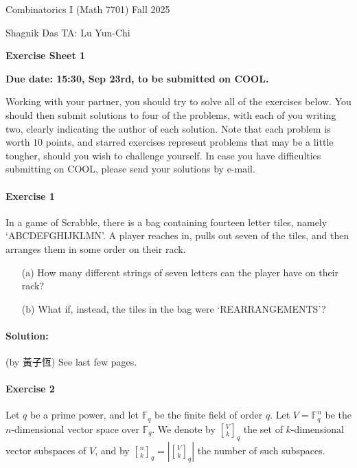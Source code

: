\documentclass[a4paper,12pt]{article}
\newcommand{\courseTitle}{Combinatorics I (Math 7701)}
\newcommand{\semester}{Fall 2025}
\newcommand{\instructorA}{Shagnik Das}
\newcommand{\instructorB}{TA: Lu Yun-Chi}
\newcommand{\sheetNumber}{1}
\newcommand{\dueDate}{15:30, Sep 23rd, to be submitted on COOL.}
\newcommand{\buildtitle}[4]{
\begin{flushleft}
{\large
#1
\hfill{}
#2
\par
#3
}
\end{flushleft}
\vskip 4pt
\begin{center}
{\large\bfseries#4\par}
\end{center}
\bigskip
}
\newcommand{\card}[1]{\left| #1 \right|}
\newcommand{\qbinom}{\genfrac{[}{]}{0pt}{}}
\begin{document}
\buildtitle{\courseTitle{}}{\semester}{\instructorA{} \hfill \instructorB{}}{Exercise Sheet \sheetNumber{}}

\vspace{-0.2in}

\begin{center}

{\bf Due date: \dueDate{}}

\end{center}

\noindent Working with your partner, you should try to solve all of the exercises below. You should then submit solutions to four of the problems, with each of you writing two, clearly indicating the author of each solution. Note that each problem is worth $10$ points, and starred exercises represent problems that may be a little tougher, should you wish to challenge yourself. In case you have difficulties submitting on COOL, please send your solutions by e-mail.

\paragraph{Exercise 1}  In a game of Scrabble, there is a bag containing fourteen letter tiles, namely {`ABCDEFGHIJKLMN'}. A player reaches in, pulls out seven of the tiles, and then arranges them in some order on their rack.

\begin{itemize}
	\item[(a)] How many different strings of seven letters can the player have on their rack?
	\item[(b)] What if, instead, the tiles in the bag were `REARRANGEMENTS'?
\end{itemize}
\paragraph{Solution:} (by 黃子恆) See last few pages.

\paragraph{Exercise 2}  Let $q$ be a prime power, and let $\mathbb{F}_q$ be the finite field of order $q$. Let $V = \mathbb{F}_q^n$ be the $n$-dimensional vector space over $\mathbb{F}_q$. We denote by $\qbinom{V}{k}_q$ the set of $k$-dimensional vector subspaces of $V$, and by $\qbinom{n}{k}_q = \card{\qbinom{V}{k}_q}$ the number of such subspaces.
\end{document}

